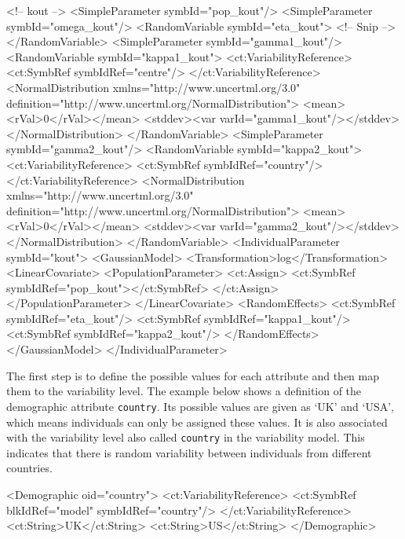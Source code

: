 \documentclass[a4paper,10pt]{article}
\begin{document}
\begin{xmlcode}
<!-- kout -->
<SimpleParameter symbId="pop_kout"/>
<SimpleParameter symbId="omega_kout"/>
<RandomVariable symbId="eta_kout">
  <!-- Snip -->
</RandomVariable>
<SimpleParameter symbId="gamma1_kout"/>
<RandomVariable symbId="kappa1_kout">
    <ct:VariabilityReference>
        <ct:SymbRef symbIdRef="centre"/>
    </ct:VariabilityReference>
    <NormalDistribution xmlns="http://www.uncertml.org/3.0" definition="http://www.uncertml.org/NormalDistribution">
        <mean><rVal>0</rVal></mean>
        <stddev><var varId="gamma1_kout"/></stddev>
    </NormalDistribution>
</RandomVariable>
<SimpleParameter symbId="gamma2_kout"/>
<RandomVariable symbId="kappa2_kout">
    <ct:VariabilityReference>
        <ct:SymbRef symbIdRef="country"/>
    </ct:VariabilityReference>
    <NormalDistribution xmlns="http://www.uncertml.org/3.0" definition="http://www.uncertml.org/NormalDistribution">
        <mean><rVal>0</rVal></mean>
        <stddev><var varId="gamma2_kout"/></stddev>
    </NormalDistribution>
</RandomVariable>
<IndividualParameter symbId="kout">
    <GaussianModel>
        <Transformation>log</Transformation>
        <LinearCovariate>
            <PopulationParameter>
                <ct:Assign>
                    <ct:SymbRef symbIdRef="pop_kout"></ct:SymbRef>
                </ct:Assign>
            </PopulationParameter>
        </LinearCovariate>
        <RandomEffects>
            <ct:SymbRef symbIdRef="eta_kout"/>
            <ct:SymbRef symbIdRef="kappa1_kout"/>
            <ct:SymbRef symbIdRef="kappa2_kout"/>
        </RandomEffects>
    </GaussianModel>
</IndividualParameter>
\end{xmlcode}

The first step is to define the possible values for each attribute and
then map them to the variability level. The example below shows a
definition of the demographic attribute \texttt{country}. Its possible
values are given as `UK' and `USA', which means
individuals can only be assigned these values. It is also associated
with the variability level also called \texttt{country} in the
variability model. This indicates that there is random variability
between individuals from different countries.
%
\begin{xmlcode}
<Demographic oid="country">
    <ct:VariabilityReference>
        <ct:SymbRef blkIdRef="model" symbIdRef="country"/>
    </ct:VariabilityReference>
    <ct:String>UK</ct:String>
    <ct:String>US</ct:String>
</Demographic>
\end{xmlcode}
\end{document}
